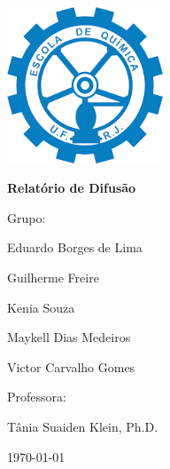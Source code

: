 \begin{titlepage}
	\centering
	\includegraphics[width=0.35\textwidth,trim={0 0 0 4cm}]{figuras/capa/index.png}\par\vspace{1cm}
	{\LARGE\bfseries Relatório de Difusão}\par
	\vspace{0.1cm}
	{\Large Grupo:\par}
	\vspace{0.01cm}
	{\Large Eduardo Borges de Lima\par}
	{\Large Guilherme Freire \par}
	{\Large Kenia Souza \par}
	{\Large Maykell Dias Medeiros\par}
	{\Large Victor Carvalho Gomes \par}
	{\Large \par}
	\vspace{0.2cm}
	\vspace{1cm}
	{\Large Professora:\par}
	\vspace{0.01cm}
	{\large Tânia Suaiden Klein, Ph.D.\par}
	\vfill
	
	{\large \today\par}
\end{titlepage}
